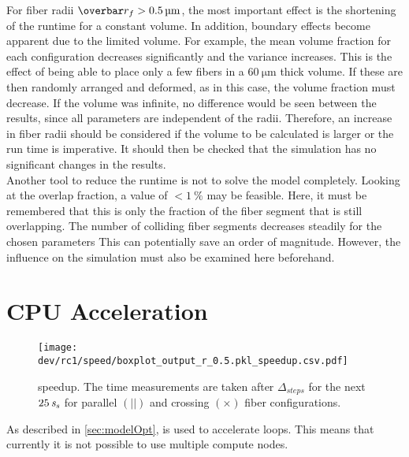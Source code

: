 % 
For fiber radii $\fiberRadiusMean > \SI{0.5}{\micro\meter}$, the most important effect is the shortening of the runtime for a constant volume.
In addition, boundary effects become apparent due to the limited volume.
For example, the mean volume fraction for each configuration decreases significantly and the variance increases.
This is the effect of being able to place only a few fibers in a $\SI{60}{\micro\meter}$ thick volume.
If these are then randomly arranged and deformed, as in this case, the volume fraction must decrease.
If the volume was infinite, no difference would be seen between the results, since all parameters are independent of the radii.
Therefore, an increase in fiber radii should be considered if the volume to be calculated is larger or the run time is imperative.
It should then be checked that the simulation has no significant changes in the results.
\\
% 
Another tool to reduce the runtime is not to solve the model completely. 
Looking at the overlap fraction, a value of $<\SI{1}{\percent}$ may be feasible.
Here, it must be remembered that this is only the fraction of the fiber segment that is still overlapping.
The number of colliding fiber segments decreases steadily for the chosen parameters
This can potentially save an order of magnitude.
However, the influence on the simulation must also be examined here beforehand.
% 
% 
%
% 
\section{CPU Acceleration}
% 
\begin{figure}[!t]
\centering
\texttt{[image: dev/rc1/speed/boxplot\_output\_r\_0.5.pkl\_speedup.csv.pdf]}
\caption[ speedup]{ speedup. The time measurements are taken after $\Delta_{\mathit{steps}}$ for the next $\SI{25}{\textnormal{$\mathit{s_{s}}$}}$ for parallel $(||)$ and crossing $(\times)$ fiber configurations.}
\label{fig:solverSpeedup}
\end{figure}
% 
As described in \cref{sec:modelOpt}, \openmp{} is used to accelerate  loops.
This means that currently it is not possible to use multiple compute nodes.
% 
